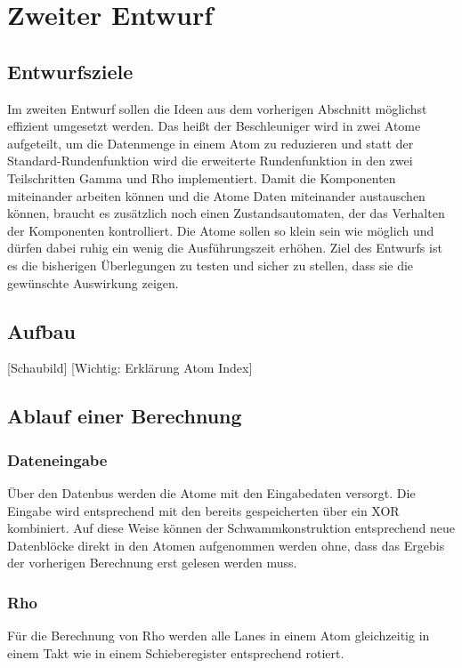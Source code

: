 \section{Zweiter Entwurf}

\subsection{Entwurfsziele}
Im zweiten Entwurf sollen die Ideen aus dem vorherigen Abschnitt möglichst effizient umgesetzt werden.
Das heißt der Beschleuniger wird in zwei Atome aufgeteilt, um die Datenmenge in einem Atom zu reduzieren
und statt der Standard-Rundenfunktion wird die erweiterte Rundenfunktion in den zwei Teilschritten Gamma und Rho implementiert.
Damit die Komponenten miteinander arbeiten können und die Atome Daten miteinander austauschen können, braucht es zusätzlich noch
einen Zustandsautomaten, der das Verhalten der Komponenten kontrolliert.
Die Atome sollen so klein sein wie möglich und dürfen dabei ruhig ein wenig die Ausführungszeit erhöhen.
Ziel des Entwurfs ist es die bisherigen Überlegungen zu testen und sicher zu stellen, dass sie die gewünschte Auswirkung zeigen.

\subsection{Aufbau}
[Schaubild]
[Wichtig: Erklärung Atom Index]

\subsection{Ablauf einer Berechnung}
\subsubsection{Dateneingabe}
Über den Datenbus werden die Atome mit den Eingabedaten versorgt. Die Eingabe wird entsprechend mit den bereits gespeicherten über ein XOR kombiniert.
Auf diese Weise können der Schwammkonstruktion entsprechend neue Datenblöcke direkt in den Atomen aufgenommen werden ohne,
dass das Ergebis der vorherigen Berechnung erst gelesen werden muss.
\subsubsection{Rho}
Für die Berechnung von Rho werden alle Lanes in einem Atom gleichzeitig in einem Takt wie in einem Schieberegister entsprechend rotiert.
